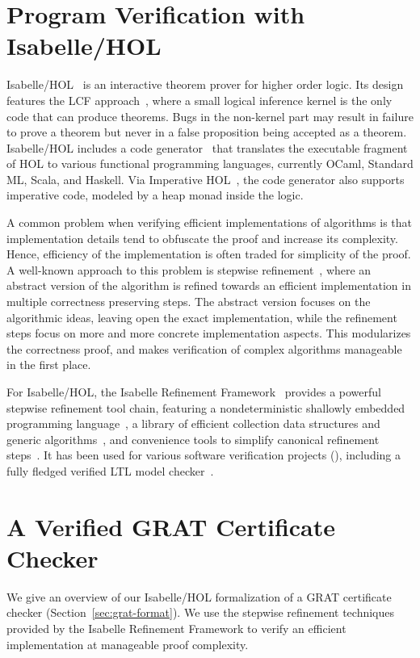 \documentclass[smallcondensed]{svjour3}     %
\begin{document}
\section{Program Verification with Isabelle/HOL}\label{sec:imp_ref_framework}
Isabelle/HOL~\cite{NPW02} is an interactive theorem prover for higher order logic. Its design features the LCF approach~\cite{Gord00}, where 
a small logical inference kernel is the only code that can produce theorems. Bugs in the non-kernel part may result in failure to 
prove a theorem but never in a false proposition being accepted as a theorem.
Isabelle/HOL includes a code generator~\cite{Haft09,HaNi10,HKKN13} that translates the executable fragment of HOL to various functional programming languages, 
currently OCaml, Standard ML, Scala, and Haskell.
Via Imperative HOL~\cite{BKHEM08}, the code generator also supports imperative code, modeled by a heap monad inside the logic.

A common problem when verifying efficient implementations of algorithms is that implementation details tend to obfuscate the proof and increase its complexity. 
Hence, efficiency of the implementation is often traded for simplicity of the proof.
A well-known approach to this problem is stepwise refinement~\cite{Wirth71,Back78,BaWr98}, where an abstract version of the algorithm is refined towards 
an efficient implementation in multiple correctness preserving steps.
The abstract version focuses on the 
algorithmic ideas, leaving open the exact implementation, while the refinement steps focus on more and more concrete implementation aspects.
This modularizes the correctness proof, and makes verification of complex algorithms manageable in the first place.

For Isabelle/HOL, the Isabelle Refinement Framework~\cite{LaTu12,La13,La15,La16} provides a powerful stepwise refinement tool chain, 
featuring a nondeterministic shallowly embedded programming language~\cite{LaTu12}, a library of efficient collection data structures and generic algorithms~\cite{LL10,La15,La16},
and convenience tools to simplify canonical refinement steps~\cite{La13,La15}. It has been used for various software verification projects (\eg \cite{La14,LaSe16,WiLa18}), 
including a fully fledged verified LTL model checker~\cite{ELNN13,BrLa16}.

\section{A Verified GRAT Certificate Checker}\label{sec:grat_verified}
We give an overview of our Isabelle/HOL formalization of a GRAT certificate checker (\cf Section~\ref{sec:grat-format}).
We use the stepwise refinement techniques provided by the Isabelle Refinement Framework to verify an efficient implementation at manageable proof complexity.
\end{document}
